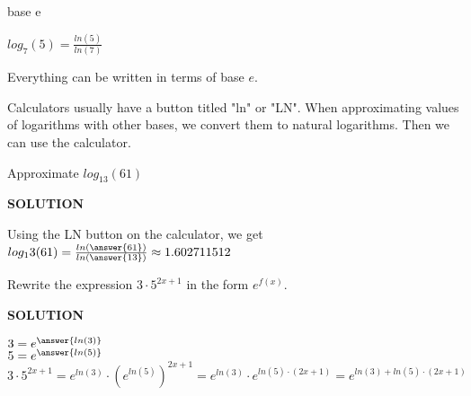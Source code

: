 \documentclass{ximera}
\begin{document}
\begin{example}  base e


$log_7(5) = \frac{ln(5)}{ln(7)}$


\end{example}
Everything can be written in terms of base $e$.


Calculators usually have a button titled "ln" or "LN".  When approximating values of logarithms with other bases, we convert them to natural logarithms.  Then we can use the calculator.









\begin{example}  


Approximate $log_13(61)$


\textbf{\textcolor{purple!50!blue!90!black}{SOLUTION}}


Using the LN button on the calculator, we get $log_13(61) = \frac{ln\left(\answer{61}\right)}{ln\left(\answer{13}\right)} \approx 1.602711512$

\end{example}








\begin{example}  


Rewrite the expression $3 \cdot 5^{2x + 1}$ in the form $e^{f(x)}$.


\textbf{\textcolor{purple!50!blue!90!black}{SOLUTION}}


$3 = e^{\answer{ln(3)}}$ \\


$5 = e^{\answer{ln(5)}}$ \\


\[   3 \cdot 5^{2x + 1} = e^{ln(3)} \cdot (e^{ln(5)})^{2x + 1}  =  e^{ln(3)} \cdot e^{ln(5) \cdot (2x + 1)}  = e^{ln(3) + ln(5) \cdot (2x + 1)} \]




\end{example}
\end{document}
